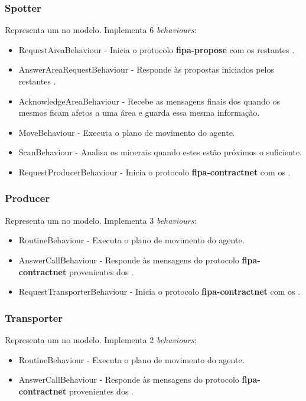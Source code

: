 \documentclass[12pt]{report}
\begin{document}
\subsubsection{Spotter}
Representa um \spotter no modelo. Implementa 6 \emph{behaviours}:
\begin{itemize}
 \item RequestAreaBehaviour - Inicia o protocolo \textbf{fipa-propose} com os restantes \spotters.
 \item AnswerAreaRequestBehaviour - Responde às propostas iniciados pelos restantes \spotters.
 \item AcknowledgeAreaBehaviour - Recebe as mensagens finais dos \spotters quando os mesmos ficam afetos a uma área e guarda essa mesma informação.
 \item MoveBehaviour - Executa o plano de movimento do agente.
 \item ScanBehaviour - Analisa os minerais quando estes estão próximos o suficiente.
 \item RequestProducerBehaviour - Inicia o protocolo \textbf{fipa-contractnet} com os \producers.
\end{itemize}

\subsubsection{Producer}
Representa um \producer no modelo. Implementa 3 \emph{behaviours}:
\begin{itemize}
 \item RoutineBehaviour - Executa o plano de movimento do agente.
 \item AnswerCallBehaviour - Responde às mensagens do protocolo \textbf{fipa-contractnet} provenientes dos \spotters.
 \item RequestTransporterBehaviour - Inicia o protocolo \textbf{fipa-contractnet} com os \transporters.
\end{itemize}


\subsubsection{Transporter}
Representa um \transporter no modelo. Implementa 2 \emph{behaviours}:
\begin{itemize}
 \item RoutineBehaviour - Executa o plano de movimento do agente.
 \item AnswerCallBehaviour - Responde às mensagens do protocolo \textbf{fipa-contractnet} provenientes dos \producers.
\end{itemize}
\end{document}
